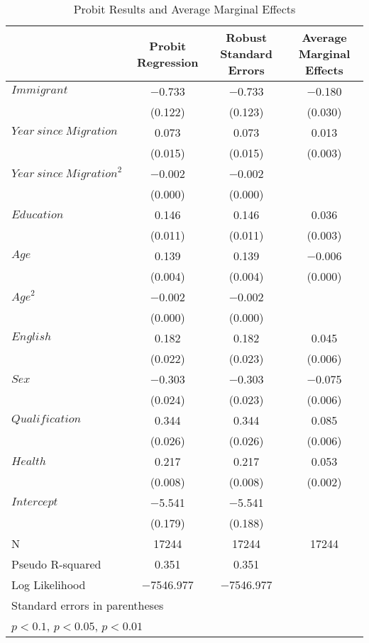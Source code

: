 \scriptsize{}
\begin{longtable}{l*{3}{c}}
  \caption{Probit Results and Average Marginal Effects\label{tab:probit}} \\
  \toprule
  &\multicolumn{1}{c}{Probit Regression}&\multicolumn{1}{c}{Robust Standard Errors}&\multicolumn{1}{c}{Average Marginal Effects}\\
  \midrule
  $\mathit{Immigrant}$& $-$0.733\sym{***}& $-$0.733\sym{***}& $-$0.180\sym{***}\\
  & (0.122) & (0.123) & (0.030) \\
  $\mathit{Year\ since\ Migration}$& 0.073\sym{***}& 0.073\sym{***}& 0.013\sym{***}\\
  & (0.015) & (0.015) & (0.003) \\
  $\mathit{Year\ since\ Migration}^2$& $-$0.002\sym{***}& $-$0.002\sym{***}& \\
  & (0.000) & (0.000) & \\
  $\mathit{Education}$& 0.146\sym{***}& 0.146\sym{***}& 0.036\sym{***}\\
  & (0.011) & (0.011) & (0.003) \\
  $\mathit{Age}$& 0.139\sym{***}& 0.139\sym{***}& $-$0.006\sym{***}\\
  & (0.004) & (0.004) & (0.000) \\
  $\mathit{Age}^2$& $-$0.002\sym{***}& $-$0.002\sym{***}& \\
  & (0.000) & (0.000) & \\
  $\mathit{English}$& 0.182\sym{***}& 0.182\sym{***}& 0.045\sym{***}\\
  & (0.022) & (0.023) & (0.006) \\
  $\mathit{Sex}$& $-$0.303\sym{***}& $-$0.303\sym{***}& $-$0.075\sym{***}\\
  & (0.024) & (0.023) & (0.006) \\
  $\mathit{Qualification}$& 0.344\sym{***}& 0.344\sym{***}& 0.085\sym{***}\\
  & (0.026) & (0.026) & (0.006) \\
  $\mathit{Health}$& 0.217\sym{***}& 0.217\sym{***}& 0.053\sym{***}\\
  & (0.008) & (0.008) & (0.002) \\
  $\mathit{Intercept}$& $-$5.541\sym{***}& $-$5.541\sym{***}& \\
  & (0.179) & (0.188) & \\
  \midrule
  N & 17244 & 17244 & 17244 \\
  Pseudo R-squared& 0.351 & 0.351 & \\
  Log Likelihood& $-$7546.977 & $-$7546.977 & \\
  \bottomrule
  \multicolumn{4}{l}{\tiny Standard errors in parentheses}\\
  \multicolumn{4}{l}{\tiny \sym{*} \(p<0.1\), \sym{**} \(p<0.05\), \sym{***} \(p<0.01\)}\\
\end{longtable}
